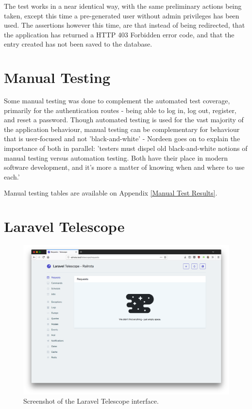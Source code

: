 The test works in a near identical way, with the same preliminary actions being taken, except this time a pre-generated user without admin privileges has been used. The assertions however this time, are that instead of being redirected, that the application has returned a HTTP 403 Forbidden error code, and that the entry created has not been saved to the database.

\section{Manual Testing}
Some manual testing was done to complement the automated test coverage, primarily for the authentication routes - being able to log in, log out, register, and reset a password. Though automated testing is used for the vast majority of the application behaviour, manual testing can be complementary for behaviour that is user-focused and not 'black-and-white' - Nordeen goes on to explain the importance of both in parallel: 'testers must dispel old black-and-white notions of manual testing versus automation testing. Both have their place in modern software development, and it's more a matter of knowing when and where to use each.' \cite{Nordeen1}

Manual testing tables are available on Appendix \ref{Manual Test Results}.

\section{Laravel Telescope}

\begin{figure}[!ht]
    \centering
    \includegraphics[width=1.0\textwidth]{Figures/screenshot-telescope}
    \caption{Screenshot of the Laravel Telescope interface.}
    \label{fig:telescope}
\end{figure}

